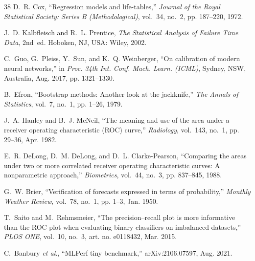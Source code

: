 \documentclass[11pt,a4paper]{article}
\begin{document}
\begin{thebibliography}{38}
D.~R. Cox, ``Regression models and life-tables,'' \emph{Journal of the Royal Statistical Society: Series B (Methodological)}, vol.~34, no.~2, pp. 187--220, 1972.

J.~D. Kalbfleisch and R.~L. Prentice, \emph{The Statistical Analysis of Failure Time Data}, 2nd~ed. Hoboken, NJ, USA: Wiley, 2002.

C.~Guo, G.~Pleiss, Y.~Sun, and K.~Q. Weinberger, ``On calibration of modern neural networks,'' in \emph{Proc. 34th Int. Conf. Mach. Learn. (ICML)}, Sydney, NSW, Australia, Aug. 2017, pp. 1321--1330.

B.~Efron, ``Bootstrap methods: Another look at the jackknife,'' \emph{The Annals of Statistics}, vol.~7, no.~1, pp. 1--26, 1979.

J.~A. Hanley and B.~J. McNeil, ``The meaning and use of the area under a receiver operating characteristic (ROC) curve,'' \emph{Radiology}, vol.~143, no.~1, pp. 29--36, Apr. 1982.

E.~R. DeLong, D.~M. DeLong, and D.~L. Clarke-Pearson, ``Comparing the areas under two or more correlated receiver operating characteristic curves: A nonparametric approach,'' \emph{Biometrics}, vol.~44, no.~3, pp. 837--845, 1988.

G.~W. Brier, ``Verification of forecasts expressed in terms of probability,'' \emph{Monthly Weather Review}, vol.~78, no.~1, pp. 1--3, Jan. 1950.

T.~Saito and M.~Rehmsmeier, ``The precision--recall plot is more informative than the ROC plot when evaluating binary classifiers on imbalanced datasets,'' \emph{PLOS ONE}, vol.~10, no.~3, art. no. e0118432, Mar. 2015.

C.~Banbury \emph{et al.}, ``MLPerf tiny benchmark,'' arXiv:2106.07597, Aug. 2021.

\end{thebibliography}
\end{document}
